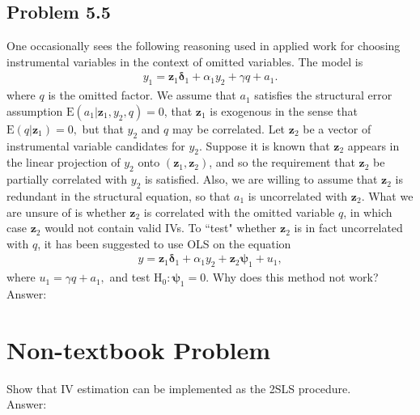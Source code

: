\documentclass[10pt]{article}
\newcommand{\E}{\text{E}}
\begin{document}
\subsection*{Problem 5.5}
One occasionally sees the following reasoning used in applied work for choosing instrumental variables in the context of omitted variables. The model is
\begin{align*}
    y_1=\textbf{z}_1\pmb{\delta}_1+\alpha_1y_2+\gamma q+a_1.
\end{align*}
where $q$ is the omitted factor. We assume that $a_1$ satisfies the structural error assumption $\E(a_1|\textbf{z}_1,y_2,q)=0$, that $\textbf{z}_1$ is exogenous in the sense that $\E(q|\textbf{z}_1)=0,$ but that $y_2$ and $q$ may be correlated. Let $\textbf{z}_2$ be a vector of instrumental variable candidates for $y_2$. Suppose it is known that $\textbf{z}_2$ appears in the linear projection of $y_2$ onto $(\textbf{z}_1,\textbf{z}_2)$, and so the requirement that $\textbf{z}_2$ be partially correlated with $y_2$ is satisfied. Also, we are willing to assume that $\textbf{z}_2$ is redundant in the structural equation, so that $a_1$ is uncorrelated with $\textbf{z}_2$. What we are unsure of is whether $\textbf{z}_2$ is correlated with the omitted variable $q$, in which case $\textbf{z}_2$ would not contain valid IVs.
To ``test" whether $\textbf{z}_2$ is in fact uncorrelated with $q$, it has been suggested to use OLS on the equation
\begin{align}
    y=\textbf{z}_1\pmb{\delta}_1+\alpha_1y_2+\textbf{z}_2\pmb{\psi}_1+u_1, \tag{5.55}\label{5.55}
\end{align}
where $u_1=\gamma q+a_1,$ and test $\text{H}_0:\pmb{\psi}_1=0.$ Why does this method not work?
\\ Answer:\\

\section*{Non-textbook Problem}
Show that IV estimation can be implemented as the 2SLS procedure.
\\ Answer:\\
\end{document}
